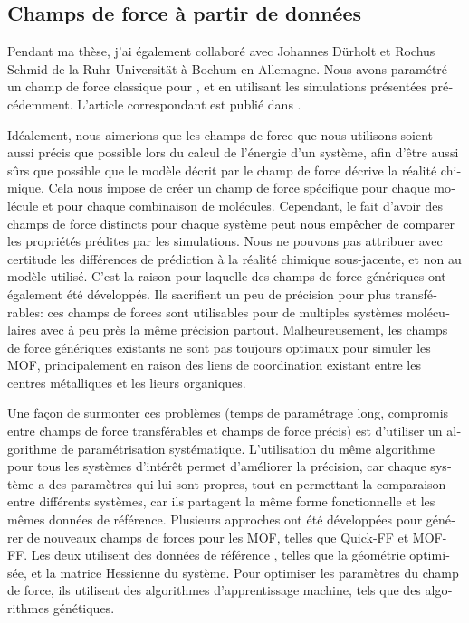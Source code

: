 \documentclass[thesis]{subfiles}
\begin{document}
\begin{otherlanguage}{french}
\clearpage
\section{Champs de force à partir de données \abinitio}

Pendant ma thèse, j'ai également collaboré avec Johannes Dürholt et Rochus
Schmid de la Ruhr Universität à Bochum en Allemagne. Nous avons paramétré un
champ de force classique pour , \ZIFCl et \ZIFBr en utilisant les
simulations \abinitio présentées précédemment. L'article correspondant est
publié dans \cite{Duerholt2019}.

Idéalement, nous aimerions que les champs de force que nous utilisons soient
aussi précis que possible lors du calcul de l'énergie d'un système, afin d'être
aussi sûrs que possible que le modèle décrit par le champ de force décrive la
réalité chimique. Cela nous impose de créer un champ de force spécifique pour
chaque molécule et pour chaque combinaison de molécules. Cependant, le fait
d'avoir des champs de force distincts pour chaque système peut nous empêcher de
comparer les propriétés prédites par les simulations. Nous ne pouvons pas
attribuer avec certitude les différences de prédiction à la réalité chimique
sous-jacente, et non au modèle utilisé. C'est la raison pour laquelle des champs
de force génériques ont également été développés. Ils sacrifient un peu de
précision pour plus transférables: ces champs de forces sont utilisables pour de
multiples systèmes moléculaires avec à peu près la même précision partout.
Malheureusement, les champs de force génériques existants ne sont pas toujours
optimaux pour simuler les MOF, principalement en raison des liens de
coordination existant entre les centres métalliques et les lieurs organiques.

Une façon de surmonter ces problèmes (temps de paramétrage long, compromis entre
champs de force transférables et champs de force précis) est d'utiliser un
algorithme de paramétrisation systématique. L'utilisation du même algorithme
pour tous les systèmes d'intérêt permet d'améliorer la précision, car chaque
système a des paramètres qui lui sont propres, tout en permettant la comparaison
entre différents systèmes, car ils partagent la même forme fonctionnelle et les
mêmes données de référence. Plusieurs approches ont été développées pour générer
de nouveaux champs de forces pour les MOF, telles que
Quick-FF\cite{Vanduyfhuys2015} et MOF-FF\cite{Bureekaew2013}. Les deux utilisent
des données de référence \abinitio, telles que la géométrie optimisée, et la
matrice Hessienne du système. Pour optimiser les paramètres du champ de force,
ils utilisent des algorithmes d'apprentissage machine, tels que des algorithmes
génétiques.


\end{otherlanguage}
\end{document}
